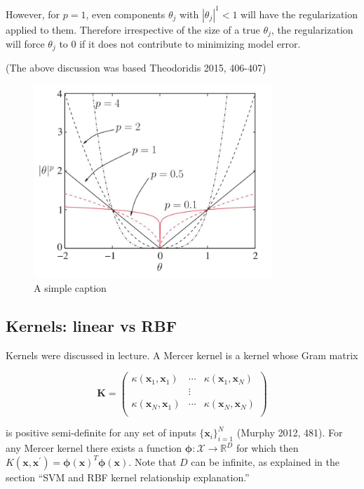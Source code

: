 \documentclass[letterpaper, 11pt]{article}
\newcommand{\vect}[1]{\boldsymbol{#1}}
\begin{document}
However, for $p = 1$, even components $\theta_j$ with $|\theta_j|^1 < 1$ will have the regularization applied to them. Therefore irrespective of the size of a true $\theta_j$, the regularization will force $\theta_j$ to 0 if it does not contribute to minimizing model error.

(The above discussion was based Theodoridis 2015, 406-407)

\begin{figure}[ht!]
\centering
\includegraphics[width=90mm]{figure1.jpg}
\caption{A simple caption \label{overflow}}
\end{figure}

\subsection{Kernels: linear vs RBF}

Kernels were discussed in lecture. A Mercer kernel is a kernel whose Gram matrix

\begin{equation*}
  \vect{K} = \begin{pmatrix}
    \kappa(\vect{x}_1, \vect{x}_1) & \cdots & \kappa(\vect{x}_1, \vect{x}_N) \\
    & \vdots & \\
    \kappa(\vect{x}_N, \vect{x}_1) & \cdots & \kappa(\vect{x}_N, \vect{x}_N) \\    
  \end{pmatrix}
\end{equation*}

is positive semi-definite for any set of inputs $\{\vect{x}_i\}_{i=1}^N$ (Murphy 2012, 481). For any Mercer kernel there exists a function $\vect{\phi}: \mathcal{X} \rightarrow \mathbb{R}^D$ for which then $K(\vect{x}, \vect{x}^\prime) = \vect{\phi}(\vect{x})^T\vect{\phi}(\vect{x})$. Note that $D$ can be infinite, as explained in the section ``SVM and RBF kernel relationship explanation.''
\end{document}
